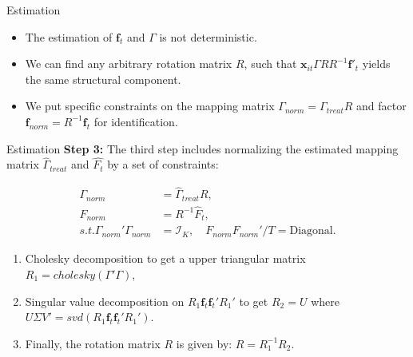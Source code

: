 \documentclass{beamer}
\begin{document}
\begin{frame}{Estimation}
    \begin{itemize}
        \item The estimation of $\boldsymbol{f}_{t}$ and $\Gamma$ is not deterministic.
        \item We can find any arbitrary rotation matrix $R$, such that $\boldsymbol{x}_{it}\Gamma R R^{-1}\boldsymbol{f}'_{t}$ yields the same structural component.
        \item We put specific constraints on the mapping matrix $\Gamma_{norm} = \Gamma_{treat}R$ and factor $\boldsymbol{f}_{norm} = R^{-1}\boldsymbol{f}_t$ for identification.
    \end{itemize}
\end{frame}

\begin{frame}{Estimation}    
    \textbf{Step 3:} The third step includes normalizing the estimated mapping matrix $\hat{\Gamma}_{treat}$ and $\hat{F_t}$ by a set of constraints:
    
    \begin{equation*}
    \begin{aligned}
    \Gamma_{norm} &= \hat{\Gamma}_{treat} R, \\
    F_{norm} &= R^{-1} \hat{F}_t, \\
    s.t. \Gamma_{norm}'\Gamma_{norm} &= \mathcal{I}_K, \quad F_{norm} F_{norm}'/T = \text{Diagonal}.
    \end{aligned}
    \end{equation*}
    
    \begin{enumerate}
        \item Cholesky decomposition to get a upper triangular matrix $R_1 = cholesky(\Gamma' \Gamma)$,
        \item Singular value decomposition on $R_1\boldsymbol{f}_t\boldsymbol{f}_t'R_1'$ to get $R_2 = U$ where $U\Sigma V'=svd(R_1\boldsymbol{f}_t\boldsymbol{f}_t'R_1')$.
        \item Finally, the rotation matrix $R$ is given by: $R = R_1^{-1}R_2.$
        \end{enumerate}
\end{frame}
\end{document}
